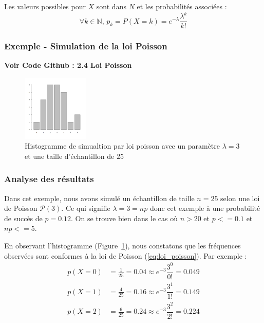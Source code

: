       Les valeurs possibles pour $X$ sont dans $N$ et les probabilités associées : 
      \begin{equation}
        \forall k\in \mathbb N,\, p_k=P(X=k)=e^{-\lambda}\dfrac{\lambda^k}{k!}
        \label{eq:loi_poisson}
      \end{equation}

    \subsubsection{Exemple - Simulation de la loi Poisson}

      \textbf{Voir Code Github \cite{git} : 2.4 Loi Poisson}

      \begin{figure}[H]
        \centering
        \includegraphics[width=0.28\textwidth]{4_attachments/figures/output5.png}
        \caption{Histogramme de simualtion par loi poisson avec un paramètre $\lambda=3$ et une taille d'échantillon de $25$}
        \label{fig:histogramme_poisson}
      \end{figure}

      \subsubsection{Analyse des résultats}
      Dans cet exemple, nous avons simulé un échantillon de taille $n=25$ selon une loi de Poisson $\mathcal P(3)$. Ce qui signifie $\lambda=3=np$ donc cet exemple à une probabilité de succès de $p=0.12$.
      On se trouve bien dans le cas où $n>20$ et $p<=0.1$ et $np<=5$.

      En observant l'histogramme (Figure~\ref{fig:histogramme_poisson}), nous constatons que les fréquences observées sont conformes à la loi de Poisson (\ref{eq:loi_poisson}). Par exemple :
      \[
        \begin{array}{ll}   
          p(X=0) &= \frac{1}{25} = 0.04 \approx e^{-3}\dfrac{3^0}{0!} = 0.049 \\
          p(X=1) &= \frac{4}{25} = 0.16 \approx e^{-3}\dfrac{3^1}{1!} = 0.149 \\ 
          p(X=2) &= \frac{6}{25} = 0.24 \approx e^{-3}\dfrac{3^2}{2!} = 0.224
        \end{array}
      \]


